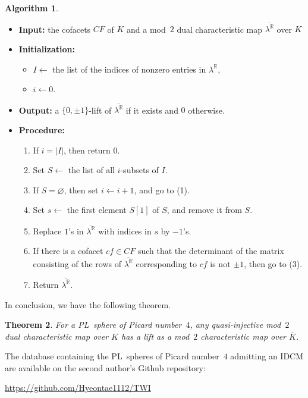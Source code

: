 \documentclass[11pt]{amsart}
\theoremstyle{plain}
\newtheorem{theorem}{Theorem}[section]
\numberwithin{equation}{section}
\theoremstyle{definition}
\newtheorem{algorithm}[theorem]{Algorithm}
\newcommand{\R}{\mathbb{R}}
\begin{document}
\begin{algorithm}~\\
    \begin{itemize}
      \item \textbf{Input:} the cofacets $CF$ of $K$ and a mod~$2$ dual characteristic map $\overline{\lambda^\R}$ over $K$
      \item \textbf{Initialization:} \begin{itemize}
                                       \item[] $I \leftarrow$ the list of the indices of nonzero entries in $\lambda^\R$,
                                       \item[] $i \leftarrow 0$.
                                     \end{itemize} 
      \item \textbf{Output:} a $\{0, \pm 1\}$-lift of $\overline{\lambda^\R}$ if it exists and $0$ otherwise.
      \item \textbf{Procedure:} \begin{enumerate}
                                  \item If $i = |I|$, then return $0$.
                                  \item Set $S \leftarrow$ the list of all $i$-subsets of $I$.
                                  \item If $S = \varnothing$, then set $i \leftarrow i+1$, and go to (1).
                                  \item Set $s \leftarrow$ the first element $S[1]$ of $S$, and remove it from $S$.
                                  \item Replace $1$'s in $\overline{\lambda^\R}$ with indices in $s$ by $-1$'s.
                                  \item If there is a cofacet $cf \in CF$ such that the determinant of the matrix consisting of the rows of $\overline{\lambda^\R}$ corresponding to $cf$ is not $\pm 1$, then go to (3).
                                  \item Return $\overline{\lambda^\R}$.
                                \end{enumerate}
    \end{itemize}
\end{algorithm}

In conclusion, we have the following theorem.

\begin{theorem}
    For a PL~sphere of Picard number~$4$, any quasi-injective mod~$2$ dual characteristic map over $K$ has a lift as a mod~$2$ characteristic map over $\overline{K}$.
\end{theorem}

The database containing the PL~spheres of Picard number~$4$ admitting an IDCM are available on the second author's Github repository:
\begin{center}
\url{https://github.com/Hyeontae1112/TWI}
\end{center}



\end{document}
